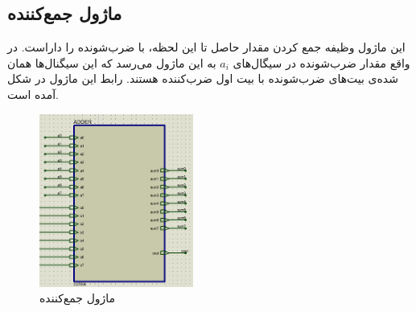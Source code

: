 \documentclass[12pt,onecolumn,a4paper,fleqn]{article}
\begin{document}
	\subsection{ماژول جمع‌کننده}
	این ماژول وظیفه جمع کردن مقدار حاصل تا این لحظه، با ضرب‌شونده را داراست. در واقع مقدار ضرب‌شونده در سیگال‌های $a_i$ به این ماژول می‌رسد که این سیگنال‌ها همان   شده‌ی بیت‌های ضرب‌شونده با بیت اول ضرب‌کننده هستند. رابط این ماژول در شکل آمده است.
	\begin{figure}[H]
		\centering
		\includegraphics[width=0.45\textwidth]{source/adder.png}
		\caption{ماژول جمع‌کننده}
		\label{fig:adder}
	\end{figure}
\end{document}

